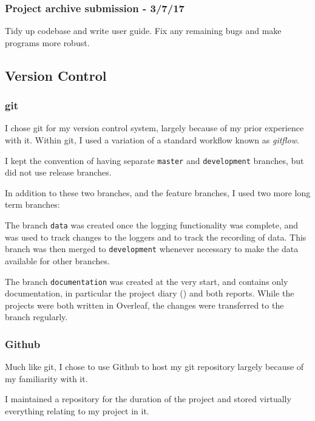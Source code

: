 \documentclass[a4paper]{article}
\begin{document}
\subsubsection{Project archive submission - 3/7/17}

Tidy up codebase and write user guide. Fix any remaining bugs and make programs more robust.

\subsection{Version Control}%

\subsubsection{git}

I chose git\cite{ppref0} for my version control system, largely because of my prior experience with it. Within git, I used a variation of a standard workflow known as \textit{gitflow}.\cite{ppref1} 

I kept the convention of having separate \lstinline{master} and \lstinline{development} branches, but did not use release branches. 

In addition to these two branches, and the feature branches, I used two more long term branches:

The branch \lstinline{data} was created once the logging functionality was complete, and was used to track changes to the loggers and to track the recording of data. This branch was then merged to \lstinline{development} whenever necessary to make the data available for other branches.

The branch \lstinline{documentation} was created at the very start, and contains only documentation, in particular the project diary () and both reports. While the projects were both written in Overleaf, the changes were transferred to the branch regularly.

\subsubsection{Github}

Much like git, I chose to use Github\cite{ppref2} to host my git repository largely because of my familiarity with it. 

I maintained a repository\cite{ppref3} for the duration of the project and stored virtually everything relating to my project in it.
\end{document}

